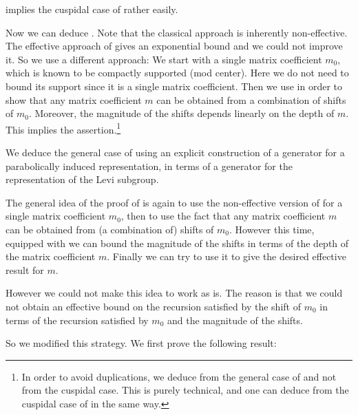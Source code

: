 \documentclass[12pt,a4paper]{amsart}%
\newcommand{\Rami}[1]{{{#1}}}
\begin{document}
 implies \Rami{the cuspidal case of}  rather easily.


Now we can deduce . 
Note that the classical approach is inherently non-effective. The effective approach of \cite{Ber_tam} gives an exponential bound and we could not improve it. So we use a different approach: We start with a single matrix coefficient $m_0$, which is known to be compactly supported (mod center). Here we do not need to bound its support since it is a single matrix coefficient.
Then we use  in order to show that any matrix coefficient $m$ can be obtained from a combination of shifts of $m_0$. Moreover, the magnitude of the shifts depends linearly on the depth of $m$. This implies the assertion.\footnote{In order to avoid duplications, we deduce  from the general case of  and not from the cuspidal case. This is purely technical, and one can deduce  from the cuspidal case of  in the same way.}

We deduce the general case of  using an explicit construction of a generator for a parabolically induced representation, in terms of a generator for the representation of the Levi subgroup.

 The general idea of the proof of  is again to use the non-effective version of  for a single matrix coefficient $m_0$, then to use the fact that any matrix coefficient  $m$ can be obtained from (a combination of) shifts of $m_0$. However this time, equipped with  we can bound the magnitude of the shifts in terms of the depth of the matrix coefficient $m$. Finally we can try to use it to give the desired effective result for $m$.

However we could not make this idea to work as is. The reason is that we could not obtain an effective bound on the recursion satisfied by  the shift of $m_0$ in terms of the recursion satisfied by $m_0$ and the magnitude of the shifts. 

So we modified this strategy. \Rami{We first prove} %
the following result:
\end{document}
